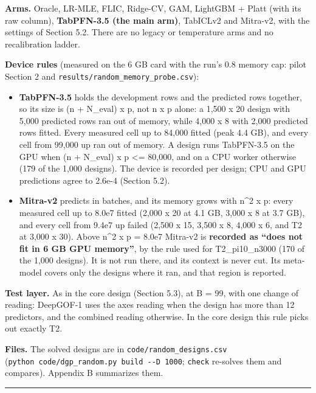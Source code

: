 \documentclass[
  10pt,
]{article}
\providecommand{\tightlist}{%
  \setlength{\itemsep}{0pt}\setlength{\parskip}{0pt}}
\begin{document}
\textbf{Arms.} Oracle, LR-MLE, FLIC, Ridge-CV, GAM, LightGBM
+ Platt (with its raw column), \textbf{TabPFN-3.5 (the main
arm)}, TabICLv2 and Mitra-v2, with the settings of Section
5.2. There are no legacy or temperature arms and no
recalibration ladder.

\textbf{Device rules} (measured on the 6 GB card with the
run's 0.8 memory cap: pilot Section 2 and
\texttt{results/random\_memory\_probe.csv}):

\begin{itemize}
\tightlist
\item
  \textbf{TabPFN-3.5} holds the development rows and the
  predicted rows together, so its size is (n + N\_eval) x p,
  not n x p alone: a 1,500 x 20 design with 5,000 predicted
  rows ran out of memory, while 4,000 x 8 with 2,000
  predicted rows fitted. Every measured cell up to 84,000
  fitted (peak 4.4 GB), and every cell from 99,000 up ran
  out of memory. A design runs TabPFN-3.5 on the GPU when (n
  + N\_eval) x p \textless= 80,000, and on a CPU worker
  otherwise (179 of the 1,000 designs). The device is
  recorded per design; CPU and GPU predictions agree to
  2.6e-4 (Section 5.2).
\item
  \textbf{Mitra-v2} predicts in batches, and its memory
  grows with n\^{}2 x p: every measured cell up to 8.0e7
  fitted (2,000 x 20 at 4.1 GB, 3,000 x 8 at 3.7 GB), and
  every cell from 9.4e7 up failed (2,500 x 15, 3,500 x 8,
  4,000 x 6, and T2 at 3,000 x 30). Above n\^{}2 x p = 8.0e7
  Mitra-v2 is \textbf{recorded as ``does not fit in 6 GB GPU
  memory''}, by the rule used for T2\_pi10\_n3000 (170 of
  the 1,000 designs). It is not run there, and its context
  is never cut. Its meta-model covers only the designs where
  it ran, and that region is reported.
\end{itemize}

\textbf{Test layer.} As in the core design (Section 5.3), at
B = 99, with one change of reading: DeepGOF-1 uses the axes
reading when the design has more than 12 predictors, and the
combined reading otherwise. In the core design this rule
picks out exactly T2.

\textbf{Files.} The solved designs are in
\texttt{code/random\_designs.csv}
(\texttt{python\ code/dgp\_random.py\ build\ -\/-D\ 1000};
\texttt{check} re-solves them and compares). Appendix B
summarizes them.

\begin{center}\rule{0.5\linewidth}{0.5pt}\end{center}
\end{document}
